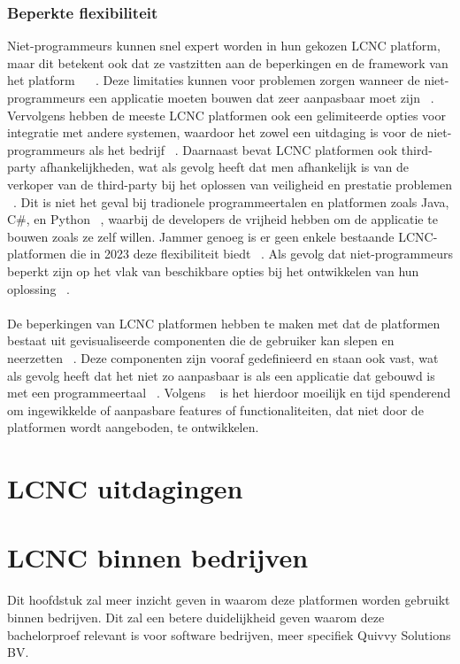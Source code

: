 \subsubsection{Beperkte flexibiliteit}
\label{subsec:beperkte-flexibiliteit}
Niet-programmeurs kunnen snel expert worden in hun gekozen LCNC platform, maar dit betekent ook dat ze vastzitten aan de beperkingen en de framework van het platform ~\autocite{Sufi_2023} ~\autocite{Talesra_2021}.
Deze limitaties kunnen voor problemen zorgen wanneer de niet-programmeurs een applicatie moeten bouwen dat zeer aanpasbaar moet zijn ~\autocite{Talesra_2021}. Vervolgens hebben de meeste LCNC platformen ook een gelimiteerde
opties voor integratie met andere systemen, waardoor het zowel een uitdaging is voor de niet-programmeurs als het bedrijf ~\autocite{Talesra_2021}. Daarnaast bevat LCNC platformen ook third-party afhankelijkheden, wat als gevolg heeft dat
men afhankelijk is van de verkoper van de third-party bij het oplossen van veiligheid en prestatie problemen ~\autocite{Talesra_2021}.
Dit is niet het geval bij tradionele programmeertalen en platformen zoals Java, C\#, en Python ~\autocite{Sufi_2023}, waarbij de developers de vrijheid hebben om de applicatie te bouwen zoals ze zelf willen.
Jammer genoeg is er geen enkele bestaande LCNC-platformen die in 2023 deze flexibiliteit biedt ~\autocite{Sufi_2023}. Als gevolg dat niet-programmeurs
beperkt zijn op het vlak van beschikbare opties bij het ontwikkelen van hun oplossing ~\autocite{Sufi_2023}.
\\
\\
De beperkingen van LCNC platformen hebben te maken met dat de platformen bestaat uit gevisualiseerde componenten die de gebruiker kan slepen en neerzetten ~\autocite{Yan2021}.
Deze componenten zijn vooraf gedefinieerd en staan ook vast, wat als gevolg heeft dat het niet zo aanpasbaar is als een applicatie dat gebouwd is met een programmeertaal ~\autocite{Yan2021}.
Volgens ~\textcite{Yan2021} is het hierdoor moeilijk en tijd spenderend om ingewikkelde of aanpasbare features of functionaliteiten, dat niet door de platformen wordt aangeboden, te ontwikkelen.

\section{LCNC uitdagingen}%
\label{sec:lcnc-uitdagingen}
\section{LCNC binnen bedrijven}
\label{sec:lcnc-bedrijven}
Dit hoofdstuk zal meer inzicht geven in waarom deze platformen worden gebruikt binnen bedrijven. Dit zal een betere duidelijkheid geven
waarom deze bachelorproef relevant is voor software bedrijven, meer specifiek Quivvy Solutions BV.

